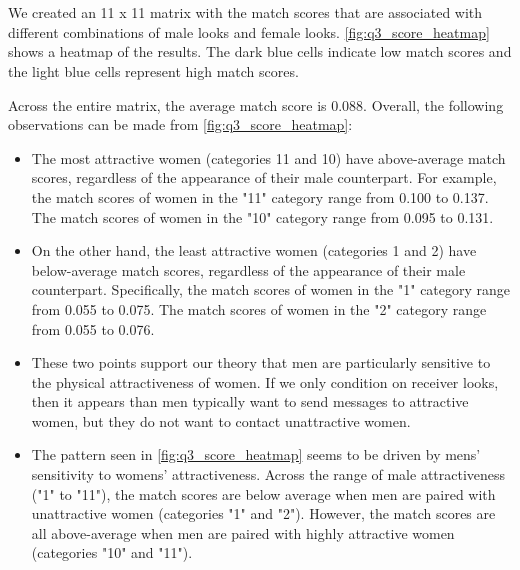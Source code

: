 \section{}
We created an 11 x 11 matrix with the match scores that are associated with different combinations of male looks and female looks. \vref{fig:q3_score_heatmap} shows a heatmap of the results. The dark blue cells indicate low match scores and the light blue cells represent high match scores. 

Across the entire matrix, the average match score is 0.088. Overall, the following observations can be made from \cref{fig:q3_score_heatmap}:
\begin{itemize}
\item The most attractive women (categories 11 and 10) have above-average match scores, regardless of the appearance of their male counterpart. For example, the match scores of women in the "11" category range from 0.100 to 0.137. The match scores of women in the "10" category range from 0.095 to 0.131.

\item On the other hand, the least attractive women (categories 1 and 2) have below-average match scores, regardless of the appearance of their male counterpart. Specifically, the  match scores of women in the "1" category range from 0.055 to 0.075. The match scores of women in the "2" category range from 0.055 to 0.076.

\item These two points support our theory that men are particularly sensitive to the physical attractiveness of women. If we only condition on receiver looks, then it appears than men typically want to send messages to attractive women, but they do not want to contact unattractive women.

\item The pattern seen in \cref{fig:q3_score_heatmap} seems to be driven by mens' sensitivity to womens' attractiveness. Across the range of male attractiveness ("1" to "11"), the match scores are below average when men are paired with unattractive women (categories "1" and "2"). However, the match scores are all above-average when men are paired with highly attractive women (categories "10" and "11").   
\end{itemize}



\section{}


